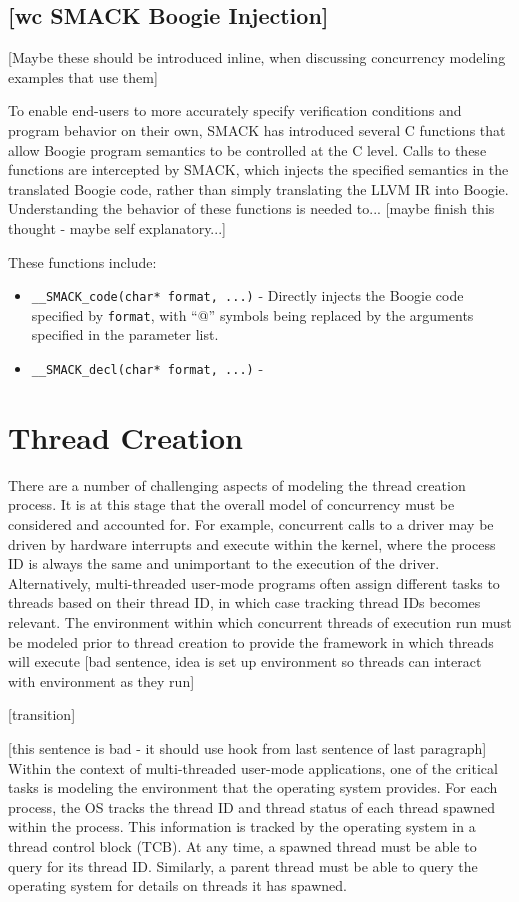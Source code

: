 \subsection{[wc SMACK Boogie Injection]}
[Maybe these should be introduced inline, when discussing concurrency
modeling examples that use them] 

To enable end-users to more accurately specify verification conditions
and program behavior on their own, SMACK has introduced several C
functions that allow Boogie program semantics to be controlled at the
C level.  Calls to these functions are intercepted by SMACK, which
injects the specified semantics in the translated Boogie code, rather
than simply translating the LLVM IR into Boogie.  Understanding the
behavior of these functions is needed to... [maybe finish this thought
- maybe self explanatory...] 

These functions include:

\begin{itemize}
\item \lstinline|__SMACK_code(char* format, ...)| - Directly injects the Boogie code specified by \lstinline|format|, with ``@'' symbols being replaced by the arguments specified in the parameter list.
\item \lstinline|__SMACK_decl(char* format, ...)| - 
\end{itemize}

\section{Thread Creation}
There are a number of challenging aspects of modeling the thread
creation process.  It is at this stage that the overall model of
concurrency must be considered and accounted for.  For example,
concurrent calls to a driver may be driven by hardware interrupts and
execute within the kernel, where the process ID is always the same and
unimportant to the execution of the driver.  Alternatively,
multi-threaded user-mode programs often assign different tasks to
threads based on their thread ID, in which case tracking thread IDs
becomes relevant.  The environment within which concurrent threads of
execution run must be modeled prior to thread creation to provide the
framework in which threads will execute [bad sentence, idea is set up
environment so threads can interact with environment as they run] 

[transition]

[this sentence is bad - it should use hook from last sentence of last
paragraph]  Within the context of multi-threaded user-mode
applications, one of the critical tasks is modeling the environment
that the operating system provides.  For each process, the OS tracks
the thread ID and thread status of each thread spawned within the
process.  This information is tracked by the operating system in a
thread control block (TCB).  At any time, a spawned thread must be
able to query for its thread ID.  Similarly, a parent thread must be
able to query the operating system for details on threads it has
spawned. 



